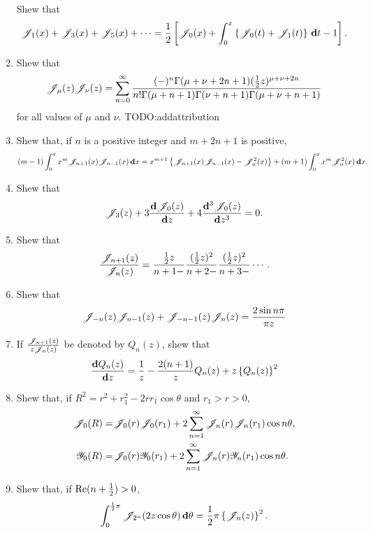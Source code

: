 \documentclass{book}
\begin{document}
\begin{enumerate}
  Shew that
  $$
  \mathscr{J}_{1}(x)
  +
  \mathscr{J}_{3}(x)
  +
  \mathscr{J}_{5}(x)
  +
  \cdots
  =
  \frac{1}{2}
  \left[ 
    \mathscr{J}_{0}(x)
    +
    \int_{0}^{x}
    \left\{ 
      \mathscr{J}_{0}(t) + \mathscr{J}_{1}(t)
     \right\}
    \, \mathbf{d} t
    -
    1
     \right].
  $$
\item
  Shew that
  $$
  \mathscr{J}_{\mu}(z) \mathscr{J}_{\nu}(z)
  =
  \sum_{n=0}^{\infty}
  \frac{(-)^{n} \Gamma(\mu+\nu+2n+1) (\frac{1}{2} z)^{\mu+\nu+2n}}{
    n! \Gamma(\mu+n+1) \Gamma(\nu+n+1) \Gamma(\mu+\nu+n+1)}
  $$
  for all values of $\mu$ and $\nu$.
  TODO:addattribution
\item
  Shew that, if $n$ is a positive integer and $m+2n+1$ is positive,
  $$
  (m-1)
  \int_{0}^{x}
  x^{m} \mathscr{J}_{n+1}(x) \mathscr{J}_{n-1}(x)
  \, \mathbf{d} x
  =
  x^{m+1}
  \left\{ 
    \mathscr{J}_{n+1}(x)\mathscr{J}_{n-1}(x) - \mathscr{J}_{n}^{2}(x)
   \right\}
  +
  (m+1)
  \int_{0}^{x} x^{m} \mathscr{J}_{n}^{2}(x)
  \, \mathbf{d} x.
  $$
\item
  Shew that
  $$
  \mathscr{J}_{3}(z)
  +
  3 \frac{\mathbf{d} \mathscr{J}_{0}(z)}{\mathbf{d} z}
  +
  4 \frac{\mathbf{d}^{3} \mathscr{J}_{0}(z)}{\mathbf{d} z^{3}}
  =
  0.
  $$
\item
  Shew that
  $$
  \frac{\mathscr{J}_{n+1}(z)}{\mathscr{J}_{n}(z)}
  =
  \frac{ \frac{1}{2} z }{n+1-}
  \frac{ (\frac{1}{2} z)^{2} }{n+2-}
  \frac{ (\frac{1}{2} z)^{2} }{n+3-}
  \cdots.
  $$
\item
  Shew that
  $$
  \mathscr{J}_{-n}(z) \mathscr{J}_{n-1}(z)
  +
  \mathscr{J}_{-n-1}(z) \mathscr{J}_{n}(z)
  =
  \frac{2 \sin n\pi}{\pi z}
  $$
\item
  If $\frac{\mathscr{J}_{n+1}(z)}{z \mathscr{J}_{n}(z)}$ be denoted by $Q_{n}(z)$,
  shew that
  $$
  \frac{ \mathbf{d} Q_{n}(z) }{\mathbf{d} z}
  =
  \frac{1}{z}
  -
  \frac{2(n+1)}{z}
  Q_{n}(z)
  +
  z \left\{  Q_{n}(z)  \right\}^{2}
  $$
\item
  Shew that, if
  $R^{2} = r^{2} + r_{1}^{2} - 2rr_{1}\cos\theta$
  and
  $r_{1} > r > 0$,
  \begin{align*}
    \mathscr{J}_{0}(R)
    =&
    \mathscr{J}_{0}(r) \mathscr{J}_{0}(r_{1})
    +
    2 \sum_{n=1}^{\infty} \mathscr{J}_{n}(r) \mathscr{J}_{n}(r_{1}) \cos n\theta,
    \\
    \mathscr{Y}_{0}(R)
    =&
    \mathscr{J}_{0}(r) \mathscr{Y}_{0}(r_{1})
    +
    2 \sum_{n=1}^{\infty} \mathscr{J}_{n}(r) \mathscr{Y}_{n}(r_{1}) \cos n\theta.
  \end{align*}
\item
  Shew that, if $\mathrm{Re}(n+\frac{1}{2}) > 0$,
  $$
  \int_{0}^{\frac{1}{2}\pi}
  \mathscr{J}_{2^{n}}(2z\cos\theta) \, \mathbf{d} \theta
  =
  \frac{1}{2}\pi \left\{  \mathscr{J}_{n}(z)  \right\}^{2}.
$$
\end{enumerate}
\end{document}
